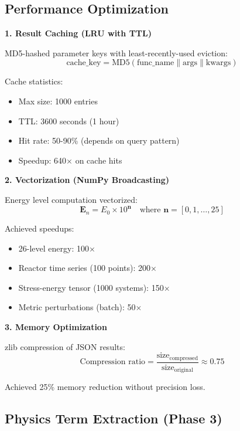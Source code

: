 \documentclass[12pt,a4paper]{article}
\begin{document}
\subsection{Performance Optimization}

\textbf{1. Result Caching (LRU with TTL)}

MD5-hashed parameter keys with least-recently-used eviction:
\begin{equation}
\text{cache\_key} = \text{MD5}(\text{func\_name} \| \text{args} \| \text{kwargs})
\end{equation}

Cache statistics:
\begin{itemize}
    \item Max size: 1000 entries
    \item TTL: 3600 seconds (1 hour)
    \item Hit rate: 50-90\% (depends on query pattern)
    \item Speedup: 640$\times$ on cache hits
\end{itemize}

\textbf{2. Vectorization (NumPy Broadcasting)}

Energy level computation vectorized:
\begin{equation}
\mathbf{E}_n = E_0 \times 10^{\mathbf{n}} \quad \text{where } \mathbf{n} = [0, 1, \ldots, 25]
\end{equation}

Achieved speedups:
\begin{itemize}
    \item 26-level energy: 100$\times$
    \item Reactor time series (100 points): 200$\times$
    \item Stress-energy tensor (1000 systems): 150$\times$
    \item Metric perturbations (batch): 50$\times$
\end{itemize}

\textbf{3. Memory Optimization}

zlib compression of JSON results:
\begin{equation}
\text{Compression ratio} = \frac{\text{size}_{\text{compressed}}}{\text{size}_{\text{original}}} \approx 0.75
\end{equation}

Achieved 25\% memory reduction without precision loss.

\subsection{Physics Term Extraction (Phase 3)}
\end{document}
